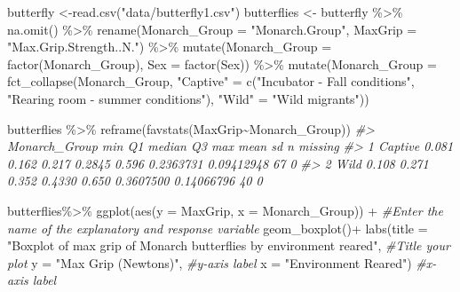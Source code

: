 \documentclass[
]{report}
\newenvironment{Shaded}{\begin{snugshade}}{\end{snugshade}}
\newcommand{\AttributeTok}[1]{\textcolor[rgb]{0.77,0.63,0.00}{#1}}
\newcommand{\CommentTok}[1]{\textcolor[rgb]{0.56,0.35,0.01}{\textit{#1}}}
\newcommand{\FunctionTok}[1]{\textcolor[rgb]{0.00,0.00,0.00}{#1}}
\newcommand{\NormalTok}[1]{#1}
\newcommand{\OtherTok}[1]{\textcolor[rgb]{0.56,0.35,0.01}{#1}}
\newcommand{\SpecialCharTok}[1]{\textcolor[rgb]{0.00,0.00,0.00}{#1}}
\newcommand{\StringTok}[1]{\textcolor[rgb]{0.31,0.60,0.02}{#1}}
\begin{document}
\begin{Shaded}
\begin{Highlighting}[]
\NormalTok{butterfly }\OtherTok{\textless{}{-}}\FunctionTok{read.csv}\NormalTok{(}\StringTok{"data/butterfly1.csv"}\NormalTok{)}
\NormalTok{butterflies }\OtherTok{\textless{}{-}}\NormalTok{ butterfly }\SpecialCharTok{\%\textgreater{}\%} 
  \FunctionTok{na.omit}\NormalTok{() }\SpecialCharTok{\%\textgreater{}\%}
  \FunctionTok{rename}\NormalTok{(}\AttributeTok{Monarch\_Group =} \StringTok{"Monarch.Group"}\NormalTok{,}
         \AttributeTok{MaxGrip =} \StringTok{"Max.Grip.Strength..N."}\NormalTok{) }\SpecialCharTok{\%\textgreater{}\%}
  \FunctionTok{mutate}\NormalTok{(}\AttributeTok{Monarch\_Group =} \FunctionTok{factor}\NormalTok{(Monarch\_Group),}
         \AttributeTok{Sex =} \FunctionTok{factor}\NormalTok{(Sex)) }\SpecialCharTok{\%\textgreater{}\%}
  \FunctionTok{mutate}\NormalTok{(}\AttributeTok{Monarch\_Group =} \FunctionTok{fct\_collapse}\NormalTok{(Monarch\_Group,}
               \StringTok{"Captive"} \OtherTok{=} \FunctionTok{c}\NormalTok{(}\StringTok{"Incubator {-} Fall conditions"}\NormalTok{,}
                             \StringTok{"Rearing room {-} summer conditions"}\NormalTok{),}
               \StringTok{"Wild"} \OtherTok{=} \StringTok{"Wild migrants"}\NormalTok{))}

\NormalTok{butterflies }\SpecialCharTok{\%\textgreater{}\%}
    \FunctionTok{reframe}\NormalTok{(}\FunctionTok{favstats}\NormalTok{(MaxGrip}\SpecialCharTok{\textasciitilde{}}\NormalTok{Monarch\_Group))}
\CommentTok{\#\textgreater{}   Monarch\_Group   min    Q1 median     Q3   max      mean         sd  n missing}
\CommentTok{\#\textgreater{} 1       Captive 0.081 0.162  0.217 0.2845 0.596 0.2363731 0.09412948 67       0}
\CommentTok{\#\textgreater{} 2          Wild 0.108 0.271  0.352 0.4330 0.650 0.3607500 0.14066796 40       0}
\end{Highlighting}
\end{Shaded}

\begin{Shaded}
\begin{Highlighting}[]
\NormalTok{butterflies}\SpecialCharTok{\%\textgreater{}\%}
  \FunctionTok{ggplot}\NormalTok{(}\FunctionTok{aes}\NormalTok{(}\AttributeTok{y =}\NormalTok{ MaxGrip, }\AttributeTok{x =}\NormalTok{ Monarch\_Group))  }\SpecialCharTok{+} \CommentTok{\#Enter the name of the explanatory and response variable}
  \FunctionTok{geom\_boxplot}\NormalTok{()}\SpecialCharTok{+}
  \FunctionTok{labs}\NormalTok{(}\AttributeTok{title =} \StringTok{"Boxplot of max grip of Monarch butterflies by environment reared"}\NormalTok{, }\CommentTok{\#Title your plot}
       \AttributeTok{y =} \StringTok{"Max Grip (Newtons)"}\NormalTok{, }\CommentTok{\#y{-}axis label}
       \AttributeTok{x =} \StringTok{"Environment Reared"}\NormalTok{) }\CommentTok{\#x{-}axis label}
\end{Highlighting}
\end{Shaded}
\end{document}
